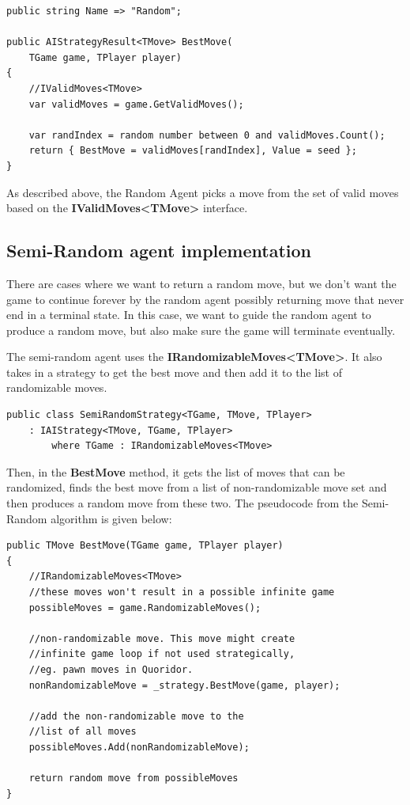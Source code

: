 \begin{lstlisting}   
public string Name => "Random";

public AIStrategyResult<TMove> BestMove(
    TGame game, TPlayer player)
{
    //IValidMoves<TMove>
    var validMoves = game.GetValidMoves();

    var randIndex = random number between 0 and validMoves.Count();
    return { BestMove = validMoves[randIndex], Value = seed };
}
\end{lstlisting}

As described above, the Random Agent picks a move from the set of valid moves based on the \textbf{IValidMoves\textless{}TMove\textgreater{}} interface.

\subsection{Semi-Random agent implementation}

There are cases where we want to return a random move, but we don't want the game to continue forever by the random agent possibly returning move that never end in a terminal state. In this case, we want to guide the random agent to produce a random move, but also make sure the game will terminate eventually.

The semi-random agent uses the \textbf{IRandomizableMoves\textless{}TMove\textgreater{}}. It also takes in a strategy to get the best move and then add it to the list of randomizable moves.

\begin{lstlisting}
public class SemiRandomStrategy<TGame, TMove, TPlayer>
    : IAIStrategy<TMove, TGame, TPlayer>
        where TGame : IRandomizableMoves<TMove>
\end{lstlisting}

Then, in the \textbf{BestMove} method, it gets the list of moves that can be randomized, finds the best move from a list of non-randomizable move set and then produces a random move from these two. The pseudocode from the Semi-Random algorithm is given below:

\begin{lstlisting}
public TMove BestMove(TGame game, TPlayer player)
{
    //IRandomizableMoves<TMove>
    //these moves won't result in a possible infinite game
    possibleMoves = game.RandomizableMoves();

    //non-randomizable move. This move might create
    //infinite game loop if not used strategically,
    //eg. pawn moves in Quoridor.
    nonRandomizableMove = _strategy.BestMove(game, player);

    //add the non-randomizable move to the
    //list of all moves
    possibleMoves.Add(nonRandomizableMove);

    return random move from possibleMoves
}
\end{lstlisting}

